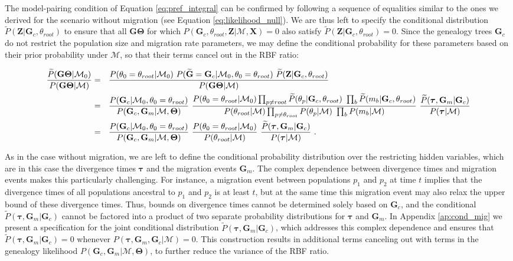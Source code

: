 \documentclass[11pt]{article}
\newcommand{\vect}[1]{\boldsymbol{\mathbf{#1}}}
\newcommand{\X}{\vect{X}}
\newcommand{\M}{\mathcal{M}}
\newcommand{\G}{\vect{G}}
\newcommand{\T}{\vect{\Theta}}
\newcommand{\GT}{\G\T}
\newcommand{\Pref}{\widetilde{P}}
\newcommand{\Gref}{\widetilde{\G}}
\newcommand{\1}{\mathbbm{1}}
\newcommand{\Z}{\vect{Z}}
\newcommand{\troot}{\theta_{root}}
\newcommand{\Gc}{\G_c}
\newcommand{\Gm}{\G_m}
\newcommand{\taus}{\vect\tau}
\begin{document}
The model-pairing condition of Equation \ref{eq:pref_integral} can be confirmed  by following a sequence of equalities similar to the ones we derived for 
the scenario without migration (see Equation \ref{eq:likelihood_null}).
%
We are thus left to specify the conditional distribution $\Pref(\Z|\Gc,\troot)$ to ensure that all $\GT$ for which $P(\Gc,\troot,\Z|\M,\X)=0$
also satisfy $\Pref(\Z|\Gc,\troot)=0$.
%
Since the genealogy trees $\Gc$ do not restrict the population size and migration rate parameters, we may define
the conditional probability for these parameters based on their prior probability under $\M$, so that their terms cancel out in the RBF ratio:
%
%
\begin{small}
\begin{align}
\frac{\Pref(\GT|\M_0) }{P(\GT|\M)}
&=~~ \frac{ P(\theta_0=\troot|\M_0) ~  P(\Gref=\Gc|\M_0,\theta_0=\troot) ~ \Pref(\Z|\Gc,\troot) } {P(\GT|\M)} \notag \\
&=~~ \frac{ P(\Gc|\M_0,\theta_0=\troot) }{ P(\Gc,\Gm|\M,\T)}~ 
     \frac{ P(\theta_0=\troot|\M_0) \prod_{p\neq root}\Pref(\theta_p|\Gc,\troot)~\prod_{b}\Pref(m_b|\Gc,\troot) }{P(\troot|\M)\prod_{p\neq\troot}P(\theta_p|\M)~\prod_{b}P(m_b|\M)}~
     \frac{ \Pref(\taus,\Gm|\Gc)}{P(\taus|\M)} \notag \\
&=~~ \frac{ P(\Gc|\M_0,\theta_0=\troot) }{ P(\Gc,\Gm|\M,\T)}~ 
     \frac{ P(\theta_0=\troot|\M_0)}{P(\troot|\M)}\
     \frac{ \Pref(\taus,\Gm|\Gc)}{P(\taus|\M)} ~. \label{eq:rbf_mig}
\end{align}
\end{small}

As in the case without migration, we are left to define the conditional probability distribution over the restricting hidden variables, which are in this case the divergence times
$\taus$ and the migration events $\Gm$.
%
The complex dependence between divergence times and migration events makes this particularly challenging.
%
For instance, a migration event between populations $p_1$ and $p_2$ at time $t$ implies that the divergence times of all populations ancestral to $p_1$ and $p_2$ is at least $t$,
%
but at the same time this migration event may also relax the upper bound of these divergence times.
%
Thus, bounds on divergence times cannot be determined solely based on $\Gc$, and the conditional $\Pref(\taus,\Gm|\Gc)$ cannot be factored into a product of
two separate probability distributions for $\taus$ and $\Gm$.
%
In Appendix \ref{ap:cond_mig} we present a specification for the joint conditional distribution $\Pref(\taus,\Gm|\Gc)$,
which addresses this complex dependence and ensures that $\Pref(\taus,\Gm|\Gc)=0$ whenever $P(\taus,\Gm,\Gc|\M)=0$.
This construction results in additional terms canceling out with terms in  the genealogy likelihood
$P(\Gc,\Gm|\M,\T)$, to further reduce the variance of the RBF ratio.
\end{document}
